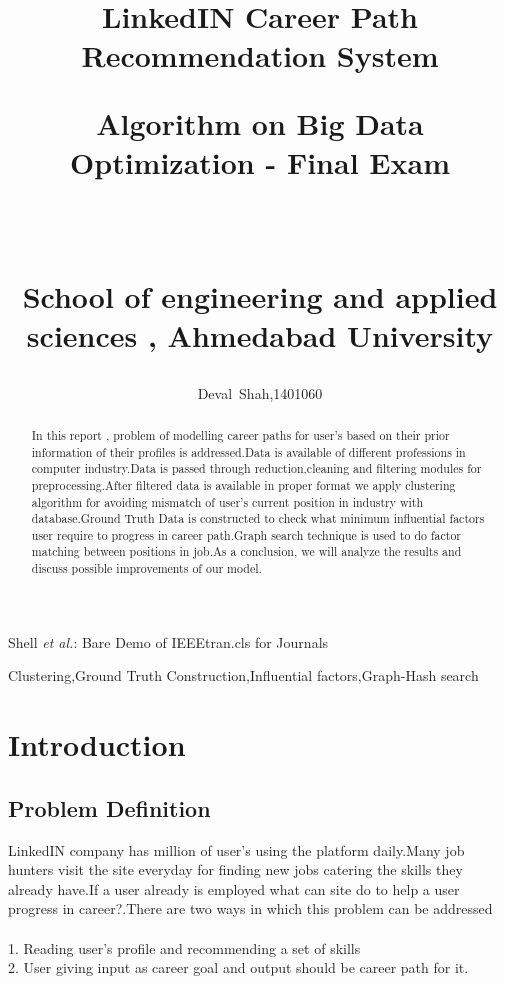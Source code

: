 \documentclass[journal]{IEEEtran}
\begin{document}
\title{ LinkedIN Career Path Recommendation System\\
\begin{large} 
  \textbf{Algorithm on Big Data Optimization - Final Exam}
\end{large}
\\
\begin{large} 
  \textbf{School of engineering and applied sciences , Ahmedabad University}
\end{large} 
}


\author{Deval~Shah,{1401060}}%


%
{Shell \MakeLowercase{\textit{et al.}}: Bare Demo of IEEEtran.cls for Journals}




\maketitle


\begin{abstract}
In this report , problem of modelling career paths for user's based on their prior information of their profiles is addressed.Data is available of different professions in computer industry.Data is passed through reduction,cleaning and filtering modules for preprocessing.After filtered data is available in proper format we apply clustering algorithm for avoiding mismatch of user's current position in industry with database.Ground Truth Data is constructed to check what minimum influential factors user require to progress in career path.Graph search technique is used to do factor matching between positions in job.As a conclusion, we will analyze the results and discuss possible improvements of our model. 
\end{abstract}

\begin{IEEEkeywords}
Clustering,Ground Truth Construction,Influential factors,Graph-Hash search
\end{IEEEkeywords}


\section{\textbf{Introduction}}
\subsection{\textbf{Problem Definition}}
LinkedIN company has million of user's using the platform daily.Many job hunters visit the site everyday for finding new jobs catering the skills they already have.If a user already is employed what can site do to help a user progress in career?.There are two ways in which this problem can be addressed 
\\
\\1. Reading user's profile and recommending a set of skills
\\2. User giving input as career goal and output should be career path for it.
\end{document}
